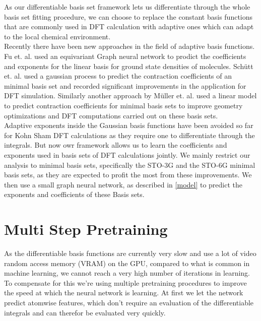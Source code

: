 As our differentiable basis set framework lets us differentiate through the whole basis set fitting procedure, we can choose to replace the constant basis functions that are commonly used in DFT calculation with adaptive ones which can adapt to the local chemical environment. \\
Recently there have been new approaches in the field of adaptive basis functions. Fu et. al. \cite{fu_recipe_2024} used an equivariant Graph neural network to prodict the coefficients and exponents for the linear basis for ground state densities of molecules. Schütt et. al.\cite{schutt_machine_2018} used a gaussian process to predict the contraction coefficients of an minimal basis set and recorded significant improvements in the application for DFT simulation. Similarly another approach by Müller et. al.\cite{muller_atom--molecule_2023} used a linear model to predict contraction coefficients for minimal basis sets to improve geometry optimizations and DFT computations carried out on these basis sets.\\
Adaptive exponents inside the Gaussian basis functions have been avoided so far for Kohn Sham DFT calculations as they require one to differentiate through the integrals.
But now owr framework allows us to learn the coefficients and exponents used in basis sets of DFT calculations jointly.
We mainly restrict our analysis to minimal basis sets, specifically the STO-3G and the STO-6G minimal basis sets, as they are expected to profit the most from these improvements.
We then use a small graph neural network, as described in \ref{model} to predict the exponents and coefficients of these Basis sets.
\section{Multi Step Pretraining}
As the differentiable basis functions are currently very slow and use a lot of video random access memory (VRAM) on the GPU, compared to what is common in machine learning, we cannot reach a very high number of iterations in learning.
To compensate for this we're using multiple pretraining procedures to improve the speed at which the neural network is learning.
At first we let the network predict atomwise features, which don't require an evaluation of the differentiable integrals and can therefor be evaluated very quickly.
